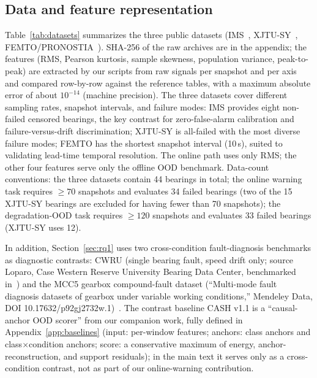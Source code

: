 \documentclass[journal]{IEEEtran}
\begin{document}
\subsection{Data and feature representation}
Table~\ref{tab:datasets} summarizes the three public datasets (IMS~\cite{lee2007}, XJTU-SY~\cite{wang2020}, FEMTO/PRONOSTIA~\cite{nectoux2012}). SHA-256 of the raw archives are in the appendix; the features (RMS, Pearson kurtosis, sample skewness, population variance, peak-to-peak) are extracted by our scripts from raw signals per snapshot and per axis and compared row-by-row against the reference tables, with a maximum absolute error of about $10^{-14}$ (machine precision). The three datasets cover different sampling rates, snapshot intervals, and failure modes: IMS provides eight non-failed censored bearings, the key contrast for zero-false-alarm calibration and failure-versus-drift discrimination; XJTU-SY is all-failed with the most diverse failure modes; FEMTO has the shortest snapshot interval (10\,s), suited to validating lead-time temporal resolution. The online path uses only RMS; the other four features serve only the offline OOD benchmark. Data-count conventions: the three datasets contain 44 bearings in total; the online warning task requires $\ge70$ snapshots and evaluates 34 failed bearings (two of the 15 XJTU-SY bearings are excluded for having fewer than 70 snapshots); the degradation-OOD task requires $\ge120$ snapshots and evaluates 33 failed bearings (XJTU-SY uses 12).

In addition, Section~\ref{sec:rq1} uses two cross-condition fault-diagnosis benchmarks as diagnostic contrasts: CWRU (single bearing fault, speed drift only; source Loparo, Case Western Reserve University Bearing Data Center, benchmarked in~\cite{smith2015}) and the MCC5 gearbox compound-fault dataset (``Multi-mode fault diagnosis datasets of gearbox under variable working conditions,'' Mendeley Data, DOI 10.17632/p92gj2732w.1)~\cite{mcc5dataset}. The contrast baseline CASH v1.1 is a ``causal-anchor OOD scorer'' from our companion work, fully defined in Appendix~\ref{app:baselines} (input: per-window features; anchors: class anchors and class$\times$condition anchors; score: a conservative maximum of energy, anchor-reconstruction, and support residuals); in the main text it serves only as a cross-condition contrast, not as part of our online-warning contribution.
\end{document}
